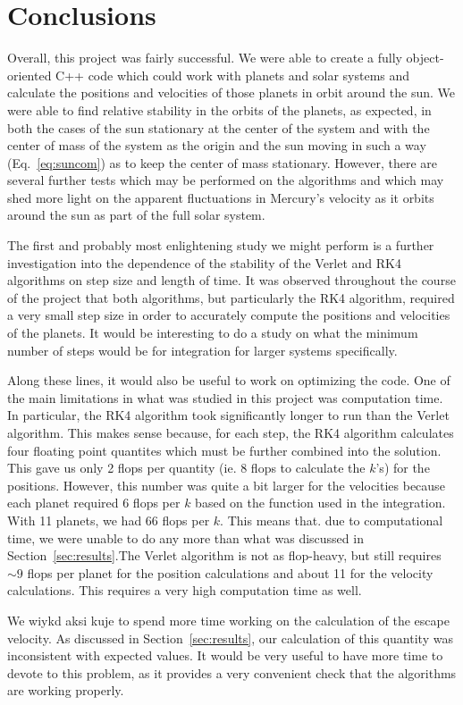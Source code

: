 \documentclass[12pt]{article}
\numberwithin{equation}{section}
\begin{document}
\section{Conclusions}
\label{sec:conclusions}

Overall, this project was fairly successful.  We were able to create a fully object-oriented C++ code which could work with planets and solar systems and calculate the positions and velocities of those planets in orbit around the sun.  We were able to find relative stability in the orbits of the planets, as expected, in both the cases of the sun stationary at the center of the system and with the center of mass of the system as the origin and the sun moving in such a way (Eq.~\ref{eq:suncom}) as to keep the center of mass stationary.  However, there are several further tests which may be performed on the algorithms and which may shed more light on the apparent fluctuations in Mercury's velocity as it orbits around the sun as part of the full solar system.
\par The first and probably most enlightening study we might perform is a further investigation into the dependence of the stability of the Verlet and RK4 algorithms on step size and length of time.  It was observed throughout the course of the project that both algorithms, but particularly the RK4 algorithm, required a very small step size in order to accurately compute the positions and velocities of the planets.  It would be interesting to do a study on what the minimum number of steps would be for integration for larger systems specifically.  
\par Along these lines, it would also be useful to work on optimizing the code.  One of the main limitations in what was studied in this project was computation time.  In particular, the RK4 algorithm took significantly longer to run than the Verlet algorithm.  This makes sense because, for each step, the RK4 algorithm calculates four floating point quantites which must be further combined into the solution.  This gave us only 2 flops per quantity (ie. 8 flops to calculate the $k$'s) for the positions.  However, this number was quite a bit larger for the velocities because each planet required 6 flops per $k$ based on the function used in the integration.  With 11 planets, we had 66 flops per $k$.  This means that. due to computational time, we were unable to do any more than what was discussed in Section~\ref{sec:results}.The Verlet algorithm is not as flop-heavy, but still requires $\sim9$ flops per planet for the position calculations and about 11 for the velocity calculations.  This requires a very high computation time as well.
\par We wiykd aksi kuje to spend more time working on the calculation of the escape velocity.  As discussed in Section~\ref{sec:results}, our calculation of this quantity was inconsistent with expected values.  It would be very useful to have more time to devote to this problem, as it provides a very convenient check that the algorithms are working properly.
\end{document}
